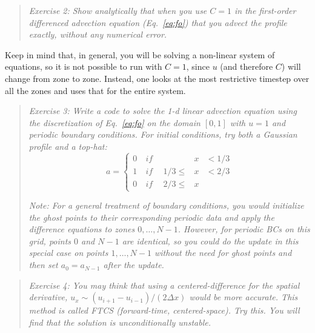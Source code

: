 \documentclass[11pt]{article}
\begin{document}
\begin{quote}
{\em Exercise 2: Show analytically that when you use $C=1$ in the
  first-order differenced advection equation (Eq.~\ref{eq:fo}) that
  you advect the profile exactly, without any numerical error.}
\end{quote}

Keep in mind that, in general, you will be solving a non-linear
system of equations, so it is not possible to run with $C=1$, 
since $u$ (and therefore $C$) will change from zone to zone.
Instead, one looks at the most restrictive timestep over all the
zones and uses that for the entire system.


\begin{quote}
{\em Exercise 3: Write a code to solve the 1-d linear advection equation
  using the discretization of Eq.~\ref{eq:fo} on the domain $[0,1]$ with
  $u=1$ and periodic boundary conditions.  For initial conditions,
  try both a Gaussian profile and a top-hat:}
  \begin{equation}
  a = \left \{
      \begin{array}{lllll}0 & \mathit{~if~~} &         &x& < 1/3 \\
                          1 & \mathit{~if~~} & 1/3 \le &x& < 2/3 \\
                          0 & \mathit{~if~~} & 2/3 \le &x&
      \end{array}
      \right .
  \end{equation}

  {\em Note: For a general treatment of boundary conditions, you would
    initialize the ghost points to their corresponding periodic data
    and apply the difference equations to zones $0, \ldots, N-1$.
    However, for periodic BCs on this grid, points $0$ and $N-1$ are
    identical, so you could do the update in this special case on
    points $1, \ldots, N-1$ without the need for ghost points and then
    set $a_0 = a_{N-1}$ after the update.}

\end{quote}


\begin{quote}
{\em Exercise 4: You may think that using a centered-difference for
  the spatial derivative, $u_x \sim (u_{i+1} - u_{i-1})/(2 \Delta x)$
  would be more accurate.  This method is called FTCS (forward-time,
  centered-space).  Try this.  You will find that the solution is
  unconditionally unstable.  }
\end{quote}
\end{document}

